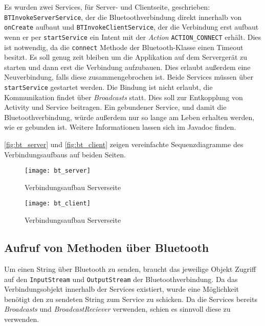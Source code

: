 \begin{sloppypar}
Es wurden zwei Services, für Server- und Clientseite, geschrieben:
\lstinline|BTInvokeServerService|, der die Bluetoothverbindung direkt innerhalb von \lstinline{onCreate} aufbaut und
\lstinline{BTInvokeClientService}, der die Verbindung erst aufbaut wenn er per \lstinline{startService} ein Intent mit der \emph{Action} \lstinline{ACTION_CONNECT} erhält. Dies ist notwendig, da die \lstinline{connect} Methode der Bluetooth-Klasse einen Timeout besitzt. Es soll genug zeit bleiben um die Applikation auf dem Servergerät zu starten und dann erst die Verbindung aufzubauen. Dies erlaubt außerdem eine Neuverbindung, falls diese zusammengebrochen ist. Beide Services müssen über \lstinline{startService} gestartet werden. Die Bindung ist nicht erlaubt, die Kommunikation findet über \emph{Broadcasts} statt. Dies soll zur Entkopplung von Activity und Service beitragen. Ein gebundener Service, und damit die Bluetoothverbindung, würde außerdem nur so lange am Leben erhalten werden, wie er gebunden ist. Weitere Informationen lassen sich im Javadoc finden.
\end{sloppypar}

\autoref{fig:bt_server} und \autoref{fig:bt_client} zeigen vereinfachte Sequenzdiagramme des Verbindungsaufbaus auf beiden Seiten.
\begin{figure}[htbp]
  \centering
  \texttt{[image: bt\_server]}
  \caption{Verbindungsaufbau Serverseite}
  \label{fig:bt_server}
\end{figure}
\begin{figure}[htbp]
  \centering
  \texttt{[image: bt\_client]}
  \caption{Verbindungsaufbau Serverseite}
  \label{fig:bt_client}
\end{figure}
%
\subsection{Aufruf von Methoden über Bluetooth}
%
Um einen String über Bluetooth zu senden, braucht das jeweilige Objekt Zugriff auf den \lstinline{InputStream} und \lstinline{OutputStream} der Bluetoothverbindung. Da das Verbindungsobjekt innerhalb der Services existiert, wurde eine Möglichkeit benötigt den zu sendeten String zum Service zu schicken. Da die Services bereits \emph{Broadcasts} und \emph{BroadcastReciever} verwenden, schien es sinnvoll diese zu verwenden.

